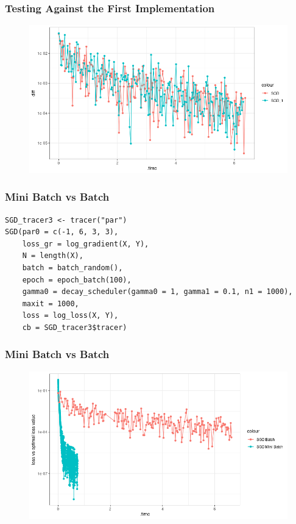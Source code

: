 \documentclass[aspectratio=169]{beamer}
\begin{document}
\begin{frame}
    \frametitle{Testing Against the First Implementation}
    \begin{figure}
        \centering
        \includegraphics[scale = 0.4]{figure/ComparisonSGD_1.png}
    \end{figure}
\end{frame}
\begin{frame}[fragile]
    \frametitle{Mini Batch vs Batch}
\begin{verbatim}
SGD_tracer3 <- tracer("par")
SGD(par0 = c(-1, 6, 3, 3),
    loss_gr = log_gradient(X, Y),
    N = length(X),
    batch = batch_random(),
    epoch = epoch_batch(100),
    gamma0 = decay_scheduler(gamma0 = 1, gamma1 = 0.1, n1 = 1000),
    maxit = 1000,
    loss = log_loss(X, Y),
    cb = SGD_tracer3$tracer)
\end{verbatim}
\end{frame}
\begin{frame}
    \frametitle{Mini Batch vs Batch}    
    \begin{figure}
        \centering
        \includegraphics[scale = 0.6]{figure/BatchVsMini.png}
    \end{figure}
\end{frame}
\end{document}
